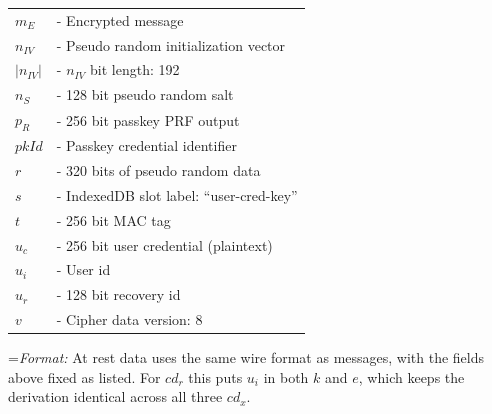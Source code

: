 \documentclass{article}
\newlength{\stanzagap}
\newlength{\notegap}
\newlength{\stanzawidth}
\newlength{\stanzabox}
\newenvironment{stanza}[1][\stanzawidth]
  {\par\addvspace{\stanzagap}%
   \setlength{\stanzabox}{\dimexpr\linewidth-\parindent\relax}%
   \ifdim\stanzabox>#1\setlength{\stanzabox}{#1}\fi
   \noindent\hspace*{\parindent}\begin{minipage}{\stanzabox}}
  {\end{minipage}\par\addvspace{\stanzagap}}
\begin{document}
\begin{stanza}
\begin{tabular}{@{}p{5mm} l}
$m_E$ & \textrm{ - Encrypted message}\\
$n_{\mathit{IV}}$ & \textrm{ - Pseudo random initialization vector}\\
$|n_{\mathit{IV}}|$ & \textrm{ - }$n_{\mathit{IV}}$\textrm{ bit length: 192}\\
$n_S$ & \textrm{ - 128 bit pseudo random salt}\\
$p_R$ & \textrm{ - 256 bit passkey PRF output}\\
$\mathit{pkId}$ & \textrm{ - Passkey credential identifier}\\
$r$ & \textrm{ - 320 bits of pseudo random data}\\
$s$ & \textrm{ - IndexedDB slot label: ``user-cred-key''}\\
$t$ & \textrm{ - 256 bit MAC tag}\\
$u_c$ & \textrm{ - 256 bit user credential (plaintext)}\\
$u_i$ & \textrm{ - User id}\\
$u_r$ & \textrm{ - 128 bit recovery id}\\
$v$ & \textrm{ - Cipher data version: 8}\\
\end{tabular}

\vspace{\notegap}

{\leftskip=\parindent\noindent\textit{Format:} At rest data uses the same wire format as messages, with the fields above fixed as listed. For $\mathit{cd}_r$ this puts $u_i$ in both $k$ and $e$, which keeps the derivation identical across all three $\mathit{cd}_x$.\par}
\end{stanza}
\end{document}
